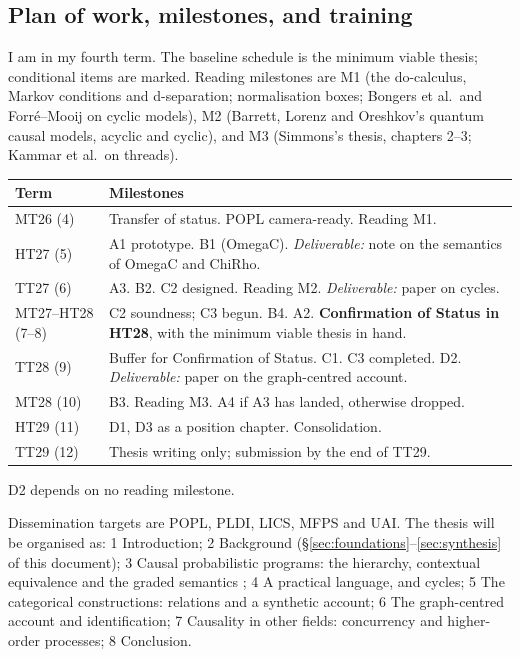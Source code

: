 \subsection{Plan of work, milestones, and training}\label{sec:plan}

I am in my fourth term. The baseline schedule is the minimum viable thesis; conditional items are marked. Reading milestones are M1 (the do-calculus, Markov conditions and d-separation; normalisation boxes; Bongers et al.\ and Forré--Mooij on cyclic models), M2 (Barrett, Lorenz and Oreshkov's quantum causal models, acyclic and cyclic), and M3 (Simmons's thesis, chapters 2--3; Kammar et al.\ on threads).

\begin{center}\small
\begin{tabularx}{\textwidth}{lX}
\toprule
Term & Milestones\\
\midrule
MT26 (4) & Transfer of status. POPL camera-ready. Reading M1.\\
HT27 (5) & A1 prototype. B1 (OmegaC). \emph{Deliverable:} note on the semantics of OmegaC and ChiRho.\\
TT27 (6) & A3. B2. C2 designed. Reading M2. \emph{Deliverable:} paper on cycles.\\
MT27--HT28 (7--8) & C2 soundness; C3 begun. B4. A2. \textbf{Confirmation of Status in HT28}, with the minimum viable thesis in hand.\\
TT28 (9) & Buffer for Confirmation of Status. C1. C3 completed. D2. \emph{Deliverable:} paper on the graph-centred account.\\
MT28 (10) & B3. Reading M3. A4 if A3 has landed, otherwise dropped.\\
HT29 (11) & D1, D3 as a position chapter. Consolidation.\\
TT29 (12) & Thesis writing only; submission by the end of TT29.\\
\bottomrule
\end{tabularx}
\end{center}
\noindent D2 depends on no reading milestone.

Dissemination targets are POPL, PLDI, LICS, MFPS and UAI. The thesis will be organised as: 1 Introduction; 2 Background (\S\ref{sec:foundations}--\ref{sec:synthesis} of this document); 3 Causal probabilistic programs: the hierarchy, contextual equivalence and the graded semantics ; 4 A practical language, and cycles; 5 The categorical constructions: relations and a synthetic account; 6 The graph-centred account and identification; 7 Causality in other fields: concurrency and higher-order processes; 8 Conclusion.

